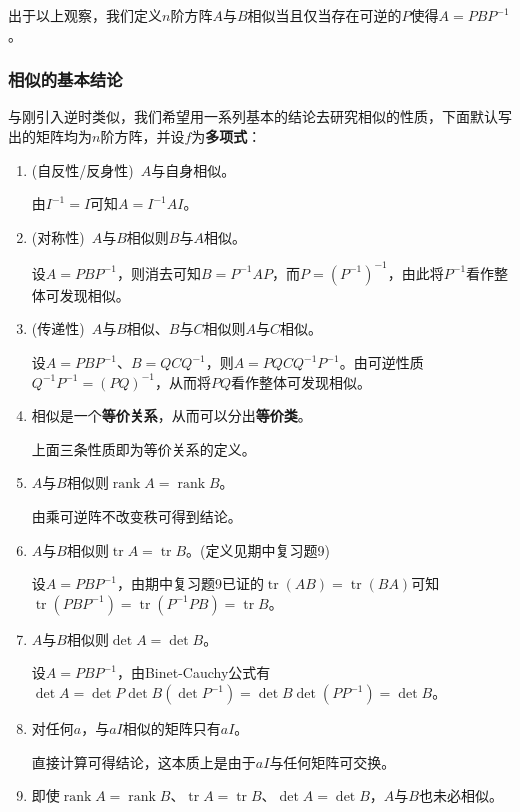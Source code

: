 \documentclass[a4paper,UTF8,fontset=windows]{ctexart}
\DeclareMathOperator{\rank}{rank}
\DeclareMathOperator{\tr}{tr}
\begin{document}
出于以上观察，我们定义$n$阶方阵$A$与$B$相似当且仅当存在可逆的$P$使得$A=PBP^{-1}$。

\subsubsection{相似的基本结论}
与刚引入逆时类似，我们希望用一系列基本的结论去研究相似的性质，下面默认写出的矩阵均为$n$阶方阵，并设$f$为\textbf{多项式}：
\begin{enumerate}
    \item (自反性/反身性)\ $A$与自身相似。
    
    由$I^{-1}=I$可知$A=I^{-1}AI$。

    \item (对称性)\ $A$与$B$相似则$B$与$A$相似。
    
    设$A=PBP^{-1}$，则消去可知$B=P^{-1}AP$，而$P=(P^{-1})^{-1}$，由此将$P^{-1}$看作整体可发现相似。

    \item (传递性)\ $A$与$B$相似、$B$与$C$相似则$A$与$C$相似。
    
    设$A=PBP^{-1}$、$B=QCQ^{-1}$，则$A=PQCQ^{-1}P^{-1}$。由可逆性质$Q^{-1}P^{-1}=(PQ)^{-1}$，从而将$PQ$看作整体可发现相似。

    \item 相似是一个\textbf{等价关系}，从而可以分出\textbf{等价类}。
    
    上面三条性质即为等价关系的定义。

    \item $A$与$B$相似则$\rank A=\rank B$。
    
    由乘可逆阵不改变秩可得到结论。

    \item $A$与$B$相似则$\tr A=\tr B$。(定义见期中复习题9)
    
    设$A=PBP^{-1}$，由期中复习题9已证的$\tr(AB)=\tr(BA)$可知$\tr(PBP^{-1})=\tr(P^{-1}PB)=\tr B$。

    \item $A$与$B$相似则$\det A=\det B$。
    
    设$A=PBP^{-1}$，由Binet-Cauchy公式有$\det A=\det P\det B(\det P^{-1})=\det B\det(PP^{-1})=\det B$。

    \item 对任何$a$，与$aI$相似的矩阵只有$aI$。
    
    直接计算可得结论，这本质上是由于$aI$与任何矩阵可交换。

    \item 即使$\rank A=\rank B$、$\tr A=\tr B$、$\det A=\det B$，$A$与$B$也未必相似。
    

\end{enumerate}
\end{document}
